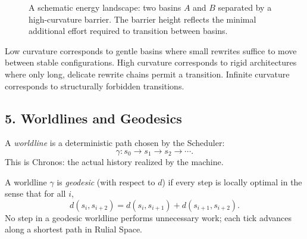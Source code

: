 \begin{figure}[h]
\centering
{}
\caption{A schematic energy landscape: two basins $A$ and $B$ separated by a high-curvature barrier. The barrier height reflects the minimal additional effort required to transition between basins.}
\label{fig:curvature-ridge}
\end{figure}

\begin{remark}
Low curvature corresponds to gentle basins where small rewrites suffice to move between stable configurations. High curvature corresponds to rigid architectures where only long, delicate rewrite chains permit a transition. Infinite curvature corresponds to structurally forbidden transitions.
\end{remark}

\subsection*{5. Worldlines and Geodesics}

\begin{definition}[Worldline]
A \emph{worldline} is a deterministic path chosen by the Scheduler:
\[
\gamma: s_0 \to s_1 \to s_2 \to \cdots.
\]
This is Chronos: the actual history realized by the machine.
\end{definition}

\begin{definition}
A worldline $\gamma$ is \emph{geodesic} (with respect to $d$) if every step is locally optimal in the sense that for all $i$,
\[
d(s_i, s_{i+2}) = d(s_i, s_{i+1}) + d(s_{i+1}, s_{i+2}).
\]
No step in a geodesic worldline performs unnecessary work; each tick advances along a shortest path in Rulial Space.
\end{definition}

